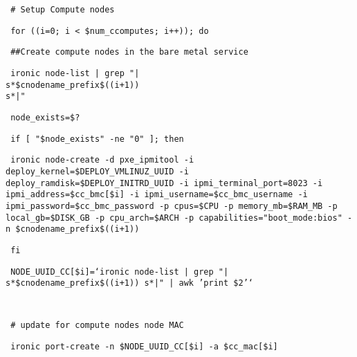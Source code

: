 \documentclass[12pt]{article}
\begin{document}
\begin{bash}\texttt{\small{ \# Setup Compute nodes}}\end{bash}
\begin{bash}\texttt{\small{     for ((i=0; i < \${num\_ccomputes}; i++)); do}}\end{bash}
\begin{bash}\texttt{\small{         \#\#Create compute nodes in the bare metal service}}\end{bash}
\begin{bash}\texttt{\small{         ironic node-list | grep "|\\s*\${cnodename\_prefix}\$((i+1))\\s*|"}}\end{bash}
\begin{bash}\texttt{\small{         node\_exists=\$?}}\end{bash}
\begin{bash}\texttt{\small{         if [ "\${node\_exists}" -ne "0" ]; then}}\end{bash}
\begin{bash}\texttt{\small{             ironic node-create -d pxe\_ipmitool -i deploy\_kernel=\${DEPLOY\_VMLINUZ\_UUID} -i deploy\_ramdisk=\${DEPLOY\_INITRD\_UUID} -i ipmi\_terminal\_port=8023 -i ipmi\_address=\${cc\_bmc[\$i]} -i ipmi\_username=\${cc\_bmc\_username} -i ipmi\_password=\${cc\_bmc\_password} -p cpus=\${CPU} -p memory\_mb=\${RAM\_MB} -p local\_gb=\${DISK\_GB} -p cpu\_arch=\${ARCH} -p capabilities="boot\_mode:bios" -n \${cnodename\_prefix}\$((i+1))}}\end{bash}
\begin{bash}\texttt{\small{         fi}}\end{bash}
\begin{bash}\texttt{\small{         NODE\_UUID\_CC[\$i]=`ironic node-list | grep "|\\s*\${cnodename\_prefix}\$((i+1))\\s*|" | awk '{print \$2}'`}}\end{bash}
\begin{bash}\texttt{\small{ }}\end{bash}
\begin{bash}\texttt{\small{         \# update for compute nodes node MAC}}\end{bash}
\begin{bash}\texttt{\small{         ironic port-create -n \${NODE\_UUID\_CC[\$i]} -a \${cc\_mac[\$i]}}}\end{bash}
\begin{bash}\texttt{\small{ }}\end{bash}
\end{document}
